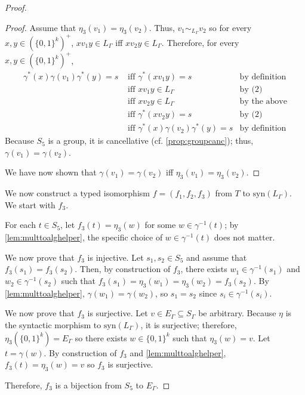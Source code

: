 \documentclass[a4paper,UKenglish,cleveref, autoref, thm-restate, anonymous]{lipics-v2021}
\begin{document}
\begin{proof}
\begin{proof}
        Assume that $\eta_3(v_1) = \eta_3(v_2)$. Thus, $v_1 \sim_{L_\Gamma} v_2$ so for every $x,y \in (\{0,1\}^k)^+$, $xv_1y \in L_\Gamma$ iff $xv_2y \in L_\Gamma$. Therefore, for every $x,y \in (\{0,1\}^k)^+$,
        \begin{align*}
            \gamma^*(x)\gamma(v_1)\gamma^*(y) = s &\text{ iff } \gamma^*(xv_1y) = s&\text{by definition}\\
            &\text{ iff } xv_1y \in L_\Gamma&\text{by (2)}\\
            &\text{ iff } xv_2y \in L_\Gamma&\text{by the above}\\
            &\text{ iff } \gamma^*(xv_2y) = s&\text{by (2)}\\
            &\text{ iff } \gamma^*(x)\gamma(v_2)\gamma^*(y) = s&\text{by definition}
        \end{align*}
        Because $S_5$ is a group, it is cancellative (cf. \autoref{prop:groupcanc}); thus, $\gamma(v_1) = \gamma(v_2)$.
        
        We have now shown that $\gamma(v_1) = \gamma(v_2)$ iff $\eta_3(v_1) = \eta_3(v_2)$.
    \end{proof}
    
    We now construct a typed isomorphism $f = (f_1, f_2, f_3)$ from $T$ to $\text{syn}(L_\Gamma)$. We start with $f_3$.
    
    For each $t \in S_5$, let $f_3(t) = \eta_3(w)$ for some $w \in \gamma^{-1}(t)$; by \autoref{lem:multtoalghelper}, the specific choice of $w \in \gamma^{-1}(t)$ does not matter. 
    
    We now prove that $f_3$ is injective. Let $s_1,s_2 \in S_5$ and assume that $f_3(s_1) = f_3(s_2)$. Then, by construction of $f_3$, there exists $w_1 \in \gamma^{-1}(s_1)$ and $w_2 \in \gamma^{-1}(s_2)$ such that $f_3(s_1) = \eta_3(w_1) = \eta_3(w_2) = f_3(s_2)$. By \autoref{lem:multtoalghelper}, $\gamma(w_1) = \gamma(w_2)$, so $s_1 = s_2$ since $s_i \in \gamma^{-1}(s_i)$.

    We now prove that $f_3$ is surjective. Let $v \in E_\Gamma \subseteq S_\Gamma$ be arbitrary. Because $\eta$ is the syntactic morphism to $\text{syn}(L_\Gamma)$, it is surjective; therefore, $\eta_3(\{0,1\}^k) = E_\Gamma$ so there exists $w \in \{0,1\}^k$ such that $\eta_3(w) = v$. Let $t = \gamma(w)$. By construction of $f_3$ and \autoref{lem:multtoalghelper}, $f_3(t) = \eta_3(w) = v$ so $f_3$ is surjective.

    Therefore, $f_3$ is a bijection from $S_5$ to $E_\Gamma$.


\end{proof}
\end{document}
